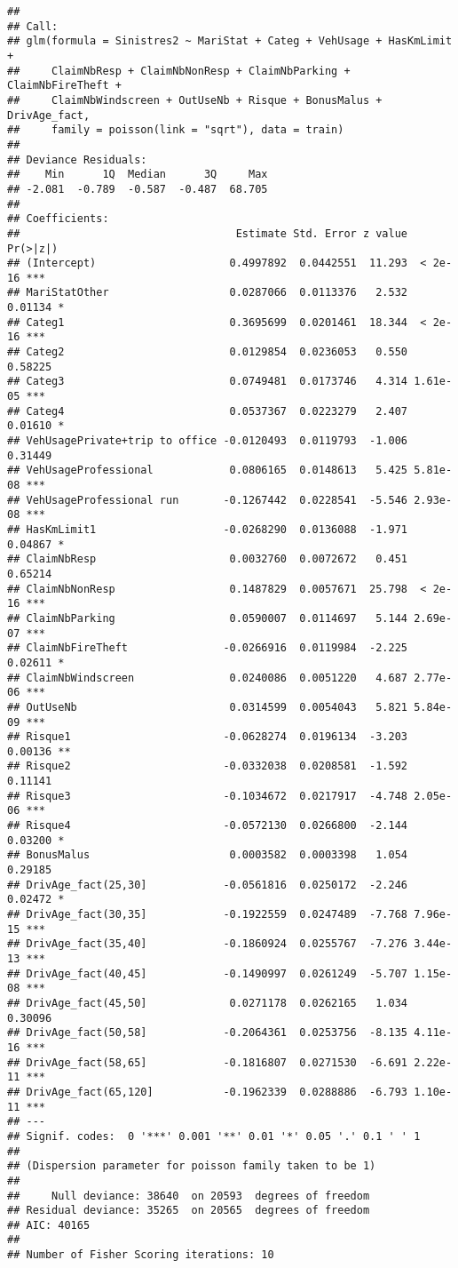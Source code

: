 \documentclass[
]{article}
\begin{document}
\begin{verbatim}
## 
## Call:
## glm(formula = Sinistres2 ~ MariStat + Categ + VehUsage + HasKmLimit + 
##     ClaimNbResp + ClaimNbNonResp + ClaimNbParking + ClaimNbFireTheft + 
##     ClaimNbWindscreen + OutUseNb + Risque + BonusMalus + DrivAge_fact, 
##     family = poisson(link = "sqrt"), data = train)
## 
## Deviance Residuals: 
##    Min      1Q  Median      3Q     Max  
## -2.081  -0.789  -0.587  -0.487  68.705  
## 
## Coefficients:
##                                  Estimate Std. Error z value Pr(>|z|)    
## (Intercept)                     0.4997892  0.0442551  11.293  < 2e-16 ***
## MariStatOther                   0.0287066  0.0113376   2.532  0.01134 *  
## Categ1                          0.3695699  0.0201461  18.344  < 2e-16 ***
## Categ2                          0.0129854  0.0236053   0.550  0.58225    
## Categ3                          0.0749481  0.0173746   4.314 1.61e-05 ***
## Categ4                          0.0537367  0.0223279   2.407  0.01610 *  
## VehUsagePrivate+trip to office -0.0120493  0.0119793  -1.006  0.31449    
## VehUsageProfessional            0.0806165  0.0148613   5.425 5.81e-08 ***
## VehUsageProfessional run       -0.1267442  0.0228541  -5.546 2.93e-08 ***
## HasKmLimit1                    -0.0268290  0.0136088  -1.971  0.04867 *  
## ClaimNbResp                     0.0032760  0.0072672   0.451  0.65214    
## ClaimNbNonResp                  0.1487829  0.0057671  25.798  < 2e-16 ***
## ClaimNbParking                  0.0590007  0.0114697   5.144 2.69e-07 ***
## ClaimNbFireTheft               -0.0266916  0.0119984  -2.225  0.02611 *  
## ClaimNbWindscreen               0.0240086  0.0051220   4.687 2.77e-06 ***
## OutUseNb                        0.0314599  0.0054043   5.821 5.84e-09 ***
## Risque1                        -0.0628274  0.0196134  -3.203  0.00136 ** 
## Risque2                        -0.0332038  0.0208581  -1.592  0.11141    
## Risque3                        -0.1034672  0.0217917  -4.748 2.05e-06 ***
## Risque4                        -0.0572130  0.0266800  -2.144  0.03200 *  
## BonusMalus                      0.0003582  0.0003398   1.054  0.29185    
## DrivAge_fact(25,30]            -0.0561816  0.0250172  -2.246  0.02472 *  
## DrivAge_fact(30,35]            -0.1922559  0.0247489  -7.768 7.96e-15 ***
## DrivAge_fact(35,40]            -0.1860924  0.0255767  -7.276 3.44e-13 ***
## DrivAge_fact(40,45]            -0.1490997  0.0261249  -5.707 1.15e-08 ***
## DrivAge_fact(45,50]             0.0271178  0.0262165   1.034  0.30096    
## DrivAge_fact(50,58]            -0.2064361  0.0253756  -8.135 4.11e-16 ***
## DrivAge_fact(58,65]            -0.1816807  0.0271530  -6.691 2.22e-11 ***
## DrivAge_fact(65,120]           -0.1962339  0.0288886  -6.793 1.10e-11 ***
## ---
## Signif. codes:  0 '***' 0.001 '**' 0.01 '*' 0.05 '.' 0.1 ' ' 1
## 
## (Dispersion parameter for poisson family taken to be 1)
## 
##     Null deviance: 38640  on 20593  degrees of freedom
## Residual deviance: 35265  on 20565  degrees of freedom
## AIC: 40165
## 
## Number of Fisher Scoring iterations: 10
\end{verbatim}
\end{document}
